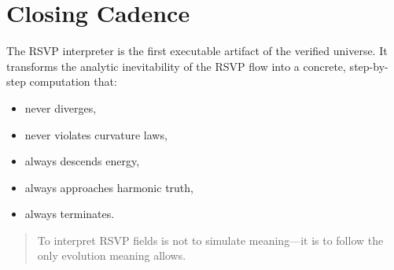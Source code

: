 \section{Closing Cadence}

The RSVP interpreter is the first executable artifact of the verified universe.
It transforms the analytic inevitability of the RSVP flow into a concrete, step-by-step computation that:
\begin{itemize}
\item never diverges,
\item never violates curvature laws,
\item always descends energy,
\item always approaches harmonic truth,
\item always terminates.
\end{itemize}

\begin{quote}
To interpret RSVP fields is not to simulate meaning---it is to follow the only evolution meaning allows.
\end{quote}

